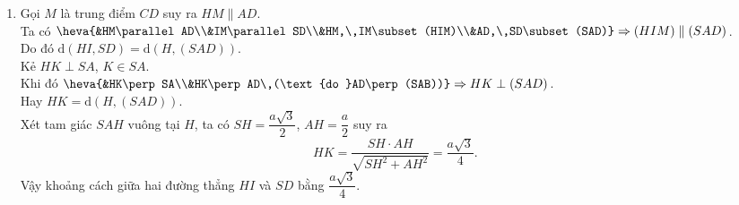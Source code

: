 \begin{ex}
{\begin{enumerate}
\item Gọi $M$ là trung điểm $CD$ suy ra $HM\parallel AD$.\\
Ta có $\heva{&HM\parallel AD\\&IM\parallel SD\\&HM,\,IM\subset (HIM)\\&AD,\,SD\subset (SAD)}\Rightarrow (HIM)\parallel (SAD)$.\\
Do đó $\mathrm{d}(HI,SD)=\mathrm{d}(H,(SAD))$.\\
Kẻ $HK\perp SA$, $K\in SA$. \\
Khi đó $\heva{&HK\perp SA\\&HK\perp AD\,(\text{do }AD\perp (SAB))}\Rightarrow HK\perp (SAD)$.\\
Hay $HK=\mathrm{d}(H,(SAD))$.\\
Xét tam giác $SAH$ vuông tại $H$, ta có $SH=\dfrac{a\sqrt{3}}{2}$, $AH=\dfrac{a}{2}$ suy ra
\[HK=\dfrac{SH\cdot AH}{\sqrt{SH^2+AH^2}}=\dfrac{a\sqrt{3}}{4}.\]
Vậy khoảng cách giữa hai đường thẳng $HI$ và $SD$ bằng $\dfrac{a\sqrt{3}}{4}$.
\end{enumerate}
}
\end{ex}

